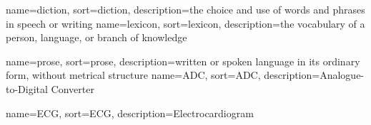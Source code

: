 


{
	name={diction},
	sort=diction,
	description={the choice and use of words and phrases in speech or writing}
}
{
	name={lexicon},
	sort=lexicon,
	description={the vocabulary of a person, language, or branch of knowledge}
}

{
	name={prose},
	sort=prose,
	description={written or spoken language in its ordinary form, without metrical structure}
}
{
	name={ADC},
	sort=ADC,
	description={Analogue-to-Digital Converter}
}

{
	name={ECG},
	sort=ECG,
	description={Electrocardiogram}
}








